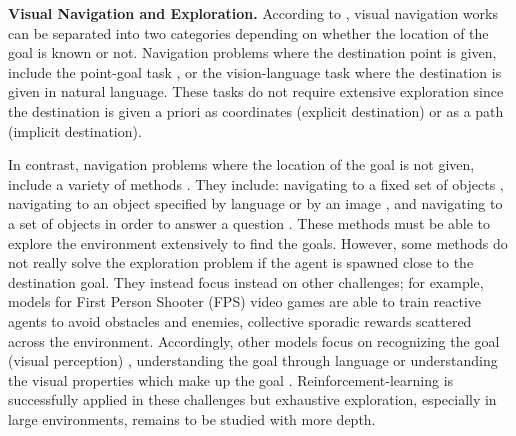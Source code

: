 
\textbf{Visual Navigation and Exploration.} %
According to \textcite{chaplot2020semantic}, visual navigation works can be separated into two categories depending on whether the location of the goal is known or not. Navigation problems where the destination point is given, include the point-goal task \cite{gupta2017cognitive, savva2017minos}, or the vision-language \cite{anderson2018vision} task where the destination is given in natural language. These tasks do not require extensive exploration since the destination is given a priori as coordinates (explicit destination) or as a path (implicit destination). 

In contrast, navigation problems where the location of the goal is not given, include a variety of methods \cite{chaplot2020semantic}. They include: navigating to a
fixed set of objects \cite{chaplot2017arnold, dosovitskiy2016learning, gupta2017cognitive, lample2017playing, mirowski2016learning, wu2016training}, navigating to an object specified by language \cite{chaplot2018gated, hermann2017grounded} or by 
an image \cite{chaplot2020neural, zhu2017target}, and navigating to a set of objects in order to answer a question 
\cite{das2018embodied, gordon2018iqa}.
These methods must be able to explore the environment extensively to find the goals. However, some methods do not really solve the exploration problem if the agent is spawned close to the destination goal. 
They instead focus instead on other challenges; for example, models for First Person Shooter (FPS) video games  \cite{chaplot2017arnold, dosovitskiy2016learning, lample2017playing,  wu2016training} are able to train reactive agents to avoid obstacles and enemies, collective sporadic rewards scattered across the environment. Accordingly, other models focus on recognizing the goal (visual perception) \cite{chaplot2020neural, zhu2017target}, understanding the goal through language \cite{chaplot2018gated, hermann2017grounded} or understanding the visual properties which make up the goal \cite{das2018embodied, gordon2018iqa}. Reinforcement-learning is successfully applied in these challenges but exhaustive exploration, especially in large environments, remains to be studied with more depth. 

